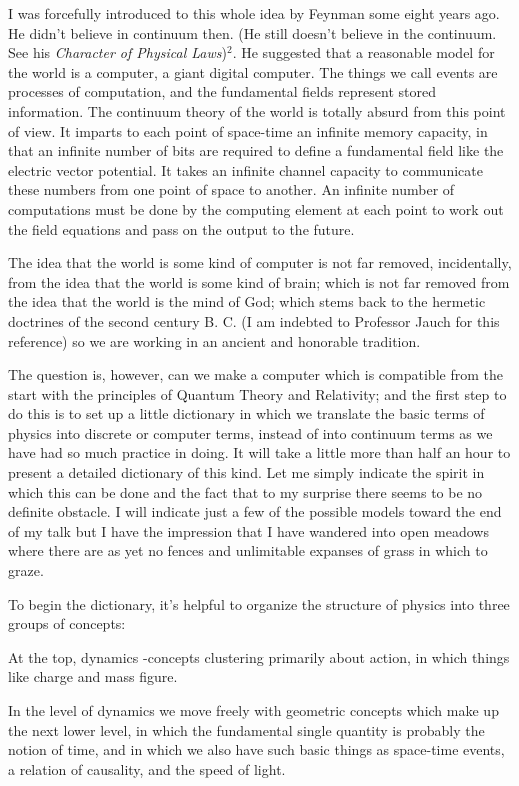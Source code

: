 I was forcefully introduced to this whole idea by Feynman some eight years ago.
He didn't believe in continuum then. (He still doesn't believe in the continuum.
See his {\em Character of Physical Laws})$^2$. He suggested that a reasonable
model for the world is a computer, a giant digital computer. The things we call
events are processes of computation, and the fundamental fields represent stored
information. The continuum theory of the world is totally absurd from this point
of view. It imparts to each point of space-time an infinite memory capacity, in
that an infinite number of bits are required to define a fundamental field like
the electric vector potential. It takes an infinite channel capacity to
communicate these numbers from one point of space to another. An infinite number
of computations must be done by the computing element at each point to work out
the field equations and pass on the output to the future.

The idea that the world is some kind of computer is not far removed,
incidentally, from the idea that the world is some kind of brain; which is not
far removed from the idea that the world is the mind of God; which stems back to
the hermetic doctrines of the second century B. C. (I am indebted to Professor
Jauch for this reference) so we are working in an ancient and honorable
tradition.

The question is, however, can we make a computer which is compatible from the
start with the principles of Quantum Theory and Relativity; and the first step to
do this is to set up a little dictionary in which we translate the basic terms of
physics into discrete or computer terms, instead of into continuum terms as we
have had so much practice in doing. It will take a little more than half an hour
to present a detailed dictionary of this kind. Let me simply indicate the spirit
in which this can be done and the fact that to my surprise there seems to be no
definite obstacle. I will indicate just a few of the possible models toward the
end of my talk but I have the impression that I have wandered into open meadows
where there are as yet no fences and unlimitable expanses of grass in which to
graze.

To begin the dictionary, it's helpful to organize the structure of physics into
three groups of concepts:

At the top, dynamics -concepts clustering primarily about action, in which things
like charge and mass figure.

In the level of dynamics we move freely with geometric concepts which make up the
next lower level, in which the fundamental single quantity is probably the notion
of time, and in which we also have such basic things as space-time events, a
relation of causality, and the speed of light.

